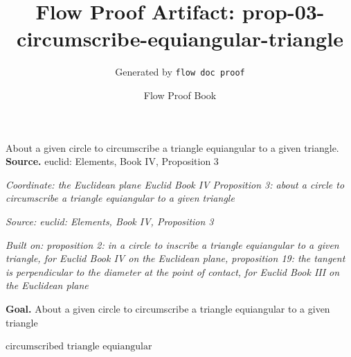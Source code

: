 \documentclass[11pt]{article}
\title{Flow Proof Artifact: prop-03-circumscribe-equiangular-triangle}
\author{Generated by \texttt{flow doc proof}}
\date{Flow Proof Book}
\theoremstyle{definition}
\begin{document}
\maketitle
About a given circle to circumscribe a triangle equiangular to a given triangle.\\[0.5em]
\textbf{Source.} euclid: Elements, Book IV, Proposition 3\\[0.5em]
\bigskip
{}\par
\smallskip\noindent\textit{Coordinate: the Euclidean plane \cdot Euclid Book IV \cdot Proposition 3: about a circle to circumscribe a triangle equiangular to a given triangle}\par
\smallskip\noindent\textit{Source: euclid: Elements, Book IV, Proposition 3}\par
\smallskip\noindent\textit{Built on: proposition 2: in a circle to inscribe a triangle equiangular to a given triangle, for Euclid Book IV on the Euclidean plane, proposition 19: the tangent is perpendicular to the diameter at the point of contact, for Euclid Book III on the Euclidean plane}\par
\medskip
\noindent\textbf{Goal.} About a given circle to circumscribe a triangle equiangular to a given triangle\par
\noindent$\displaystyle \text{circumscribed triangle equiangular}$\par
\medskip
\noindent
\end{document}
